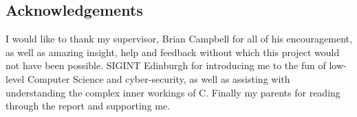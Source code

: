 \documentclass[bsc,deptreport,cs]{infthesis} %
\begin{document}
\begin{preliminary}
\maketitle

\section*{Acknowledgements}
I would like to thank my supervisor, Brian Campbell for all of his encouragement, as well as amazing insight, help and feedback without which this project would not have been possible. SIGINT Edinburgh for introducing me to the fun of low-level Computer Science and cyber-security, as well as assisting with understanding the complex inner workings of C. Finally my parents for reading through the report and supporting me.


\tableofcontents
\end{preliminary}









% 



\end{document}
